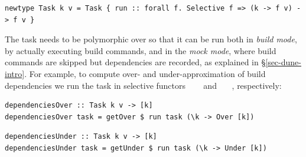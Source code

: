 \vspace{1mm}
\begin{verbatim}
newtype Task k v = Task { run :: forall f. Selective f => (k -> f v) -> f v }
\end{verbatim}
\vspace{1mm}

\noindent
The task needs to be polymorphic over  so that it can be run both in
\emph{build mode}, by actually executing build commands, and in the \emph{mock
mode}, where build commands are skipped but dependencies are recorded, as
explained in \S\ref{sec-dune-intro}. For example, to compute over- and
under-approximation of build dependencies we run the task in selective functors
~\hs{=}~~\hs{[}\hs{k]} and
~\hs{=}~~\hs{[}\hs{k]}, respectively:

\vspace{1mm}
\begin{verbatim}
dependenciesOver :: Task k v -> [k]
dependenciesOver task = getOver $ run task (\k -> Over [k])
\end{verbatim}
\vspace{0mm}
\begin{verbatim}
dependenciesUnder :: Task k v -> [k]
dependenciesUnder task = getUnder $ run task (\k -> Under [k])
\end{verbatim}
\vspace{1mm}

